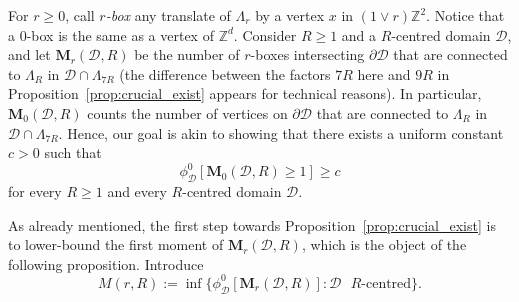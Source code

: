 \documentclass[a4paper,oneside,11pt]{article}
\numberwithin{equation}{section}
\numberwithin{equation}{section}
\numberwithin{equation}{section}
\newcommand{\calD}{\mathcal{D}}
\newcommand{\La}{\Lambda}
\begin{document}
For $r \geq 0$, call {\em $r$-box} any translate of $\Lambda_r$ by a vertex $x$ in $(1\vee r)\mathbb Z^2$. Notice that  a $0$-box is the same as a vertex of $\mathbb Z^d$. Consider $R\geq 1$ and a $R$-centred domain $\calD$, and let $\mathbf M_r(\calD,R)$ be the number of $r$-boxes intersecting $\partial \mathcal  D$ %
that are connected to $\Lambda_R$ in $\calD \cap \La_{7R}$ (the difference between the factors $7R$ here and $9R$ in Proposition~\ref{prop:crucial_exist} appears for technical reasons). 
In particular, $\mathbf M_0(\mathcal D,R)$ counts the number of vertices on $\partial \mathcal D$ that are connected to $\Lambda_R$ in $\mathcal D\cap \Lambda_{7R}$.  
Hence, our goal is akin to showing that there exists a uniform constant $c>0$ such that
\begin{equation}\label{eq:3}
  \phi_{\mathcal D}^0[\mathbf M_0(\mathcal D,R)\ge 1]\ge c
\end{equation}
for every $R \geq 1$ and every $R$-centred domain $\mathcal D$.  

As already mentioned, the first step towards Proposition~\ref{prop:crucial_exist} 
is to lower-bound the first moment of $\mathbf M_r(\calD,R)$, which is the object of the following proposition. Introduce 
\begin{equation}
	M(r,R):=\inf\{\phi_{\calD}^0[\mathbf M_{r}(\calD,R)]:\calD\text{ $R$-centred}\}.
\end{equation}
\end{document}
